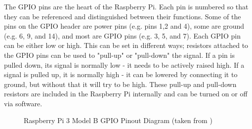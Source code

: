 \documentclass[twoside,a4]{report}
\begin{document}
	The GPIO pins are the heart of the Raspberry Pi. Each pin is numbered so that they can be referenced and distinguished between their functions. Some of the pins on the GPIO header are power pins (e.g.  pins 1,2 and 4), some are ground (e.g. 6, 9, and 14), and most are GPIO pins (e.g. 3, 5, and 7). Each GPIO pin can be either low or high. This can be set in different ways; resistors attached to the GPIO pins can be used to "pull-up" or "pull-down" the signal. If a pin is pulled down, its signal is normally low - it needs to be actively raised high. If a signal is pulled up, it is normally high - it can be lowered by connecting it to ground, but without that it will try to be high. These pull-up and pull-down resistors are included in the Raspberry Pi internally and can be turned on or off via software. \newline
	\begin{figure}[!htb]
	\centering
	\caption{Raspberry Pi 3 Model B GPIO Pinout Diagram (taken from  \cite{pigpiopinout})}
	\label{gpiopinout}
	\end{figure} \newline  \noindent
\end{document}
